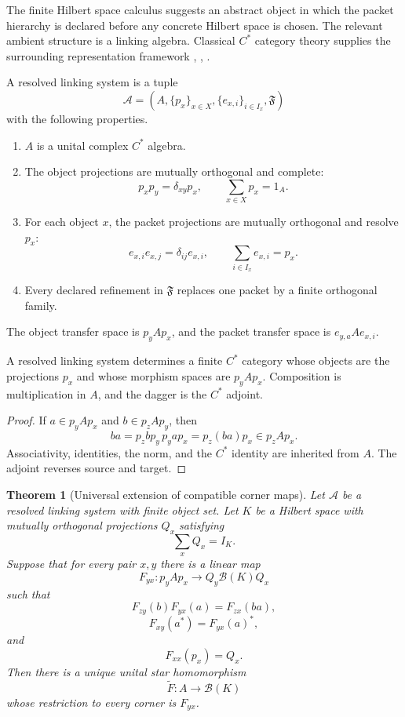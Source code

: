 \documentclass{aomart}
\newtheorem{theorem}{Theorem}[section]
\theoremstyle{definition}
\theoremstyle{remark}
\newcommand{\B}{\mathcal B}
\newcommand{\Acal}{\mathcal A}
\newcommand{\Rcite}[1]{\cite{#1}}
\begin{document}
The finite Hilbert space calculus suggests an abstract object in which the packet hierarchy is declared before any concrete Hilbert space is chosen. The relevant ambient structure is a linking algebra. Classical \(C^*\) category theory supplies the surrounding representation framework \Rcite{R2}, \Rcite{R3}, \Rcite{R4}.

\begin{definition}\label{def:resolved_linking_system}
A resolved linking system is a tuple
\[
 \Acal
 =
 \left(
 A,
 \{p_x\}_{x\in X},
 \{e_{x,i}\}_{i\in I_x},
 \mathfrak F
 \right)
\]
with the following properties.
\begin{enumerate}[label=\textup{(L\arabic*)}]
\item \(A\) is a unital complex \(C^*\) algebra.
\item The object projections are mutually orthogonal and complete:
\[
 p_xp_y=\delta_{xy}p_x,
 \qquad
 \sum_{x\in X}p_x=1_A.
\]
\item For each object \(x\), the packet projections are mutually orthogonal and resolve \(p_x\):
\[
 e_{x,i}e_{x,j}=\delta_{ij}e_{x,i},
 \qquad
 \sum_{i\in I_x}e_{x,i}=p_x.
\]
\item Every declared refinement in \(\mathfrak F\) replaces one packet by a finite orthogonal family.
\end{enumerate}
The object transfer space is \(p_yAp_x\), and the packet transfer space is \(e_{y,a}Ae_{x,i}\).
\end{definition}

\begin{proposition}\label{prop:corner_category}
A resolved linking system determines a finite \(C^*\) category whose objects are the projections \(p_x\) and whose morphism spaces are \(p_yAp_x\). Composition is multiplication in \(A\), and the dagger is the \(C^*\) adjoint.
\end{proposition}

\begin{proof}
If \(a\in p_yAp_x\) and \(b\in p_zAp_y\), then
\[
 ba=p_zbp_y\,p_yap_x=p_z(ba)p_x\in p_zAp_x.
\]
Associativity, identities, the norm, and the \(C^*\) identity are inherited from \(A\). The adjoint reverses source and target.
\end{proof}

\begin{theorem}[Universal extension of compatible corner maps]\label{thm:universal_corner_extension}
Let \(\Acal\) be a resolved linking system with finite object set. Let \(K\) be a Hilbert space with mutually orthogonal projections \(Q_x\) satisfying
\[
 \sum_xQ_x=I_K.
\]
Suppose that for every pair \(x,y\) there is a linear map
\[
 F_{yx}:p_yAp_x\longrightarrow Q_y\B(K)Q_x
\]
such that
\[
 F_{zy}(b)F_{yx}(a)=F_{zx}(ba),
\]
\[
 F_{xy}(a^*)=F_{yx}(a)^*,
\]
and
\[
 F_{xx}(p_x)=Q_x.
\]
Then there is a unique unital star homomorphism
\[
 \widetilde F:A\longrightarrow\B(K)
\]
whose restriction to every corner is \(F_{yx}\).
\end{theorem}
\end{document}
